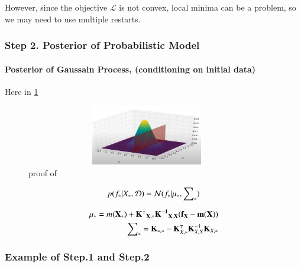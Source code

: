 \documentclass[]{elsarticle} %
\begin{document}
However, since the objective \(\mathcal{L}\) is not convex, local minima
can be a problem, so we may need to use multiple restarts.

\hypertarget{step-2.-posterior-of-probabilistic-model}{%
\subsubsection{Step 2. Posterior of Probabilistic Model}\label{step-2.-posterior-of-probabilistic-model}}

\hypertarget{posterior-of-gaussain-process-conditioning-on-initial-data}{%
\paragraph{Posterior of Gaussain Process, (conditioning on initial data)}\label{posterior-of-gaussain-process-conditioning-on-initial-data}}

Here in \ref{fig:gaus-norm}

\begin{figure}

{\centering \includegraphics[width=400px,height=100px]{img/gaus_norm} 

}

\caption{proof of}\label{fig:gaus-norm}
\end{figure}

\begin{equation}
p(f_\ast|X_\ast,\mathcal{D}) = \mathcal{N}(f_\ast|{{\bf \mu}_\ast} , \scriptsize{\sum}_{\ast}\normalsize)
\label{eq:post_proba}
\end{equation}

\begin{equation}
  \begin{split}
{{\bf \mu}_\ast}=m(\bf X_\ast) +{\bf \mathbf{K}^\intercal}_{X,*}{\bf \mathbf{K}^{-1}}_{X,X}(f_X-m(X)) \\
\scriptsize{\sum}_{\ast}=\normalsize{\mathbf{K}_{\ast,\ast}-\mathbf{K}^\intercal_{X,\ast}\mathbf{K}_{X,X}^{-1}\mathbf{K}_{X,\ast}}
  \end{split}
\label{eq:post_mean_cov}
\end{equation}

\hypertarget{example-of-step.1-and-step.2}{%
\subsubsection{Example of Step.1 and Step.2}\label{example-of-step.1-and-step.2}}
\end{document}

